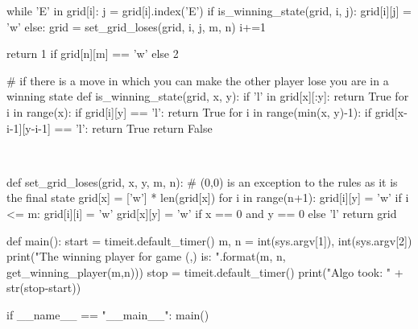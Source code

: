 \documentclass[a4paper,12pt]{article}
\begin{document}
\begin{enumerate}
\begin{python}
				while 'E' in grid[i]:
					j = grid[i].index('E')
					if is_winning_state(grid, i, j):
						grid[i][j] = 'w'
					else:
						grid = set_grid_loses(grid, i, j, m, n)
				i+=1
			
			return 1 if grid[n][m] == 'w' else 2
		\end{python}
	
		\begin{python}
		# if there is a move in which you can make the other player lose you are in a winning state
		def is_winning_state(grid, x, y):
			if 'l' in grid[x][:y]:
				return True
			for i in range(x):
				if grid[i][y] == 'l':
					return True
			for i in range(min(x, y)-1):
				if grid[x-i-1][y-i-1] == 'l':
					return True
			return False
		\end{python}~\\
	
		\begin{python}
		def set_grid_loses(grid, x, y, m, n):
			# (0,0) is an exception to the rules as it is the final state
			grid[x] = ['w'] * len(grid[x])
			for i in range(n+1):
				grid[i][y] = 'w'
				if i <= m:
					grid[i][i] = 'w'
			grid[x][y] = 'w' if x == 0 and y == 0 else 'l'
			return grid
		\end{python}
	
		\begin{python}
		def main():
			start = timeit.default_timer()
			m, n = int(sys.argv[1]), int(sys.argv[2])
			print("The winning player for game ({},{}) is: {}".format(m, n, get_winning_player(m,n)))
			stop = timeit.default_timer()
			print("Algo took: " + str(stop-start))
		
		
		if __name__ == "__main__":
			main()
		\end{python}
		
	\end{enumerate}
	
\end{document}
